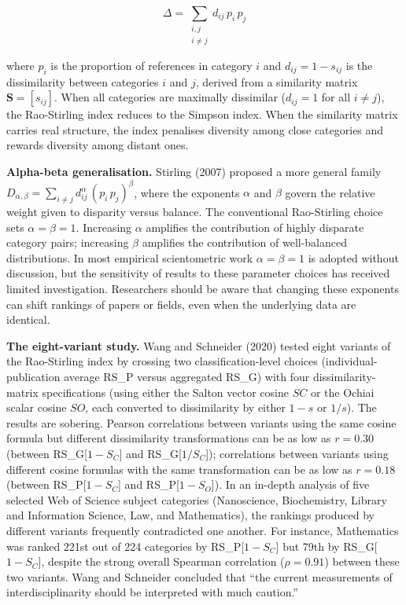 \documentclass[
]{article}
\begin{document}
\[\Delta = \sum_{\substack{i,j \\ i \neq j}} d_{ij}\, p_i\, p_j\]

where \(p_i\) is the proportion of references in category \(i\) and
\(d_{ij} = 1 - s_{ij}\) is the dissimilarity between categories \(i\)
and \(j\), derived from a similarity matrix \(\mathbf{S} = [s_{ij}]\).
When all categories are maximally dissimilar (\(d_{ij} = 1\) for all
\(i \neq j\)), the Rao-Stirling index reduces to the Simpson index. When
the similarity matrix carries real structure, the index penalises
diversity among close categories and rewards diversity among distant
ones.

\textbf{Alpha-beta generalisation.} Stirling (2007) proposed a more
general family
\(D_{\alpha,\beta} = \sum_{i \neq j} d_{ij}^{\alpha}\, (p_i\, p_j)^{\beta}\),
where the exponents \(\alpha\) and \(\beta\) govern the relative weight
given to disparity versus balance. The conventional Rao-Stirling choice
sets \(\alpha = \beta = 1\). Increasing \(\alpha\) amplifies the
contribution of highly disparate category pairs; increasing \(\beta\)
amplifies the contribution of well-balanced distributions. In most
empirical scientometric work \(\alpha = \beta = 1\) is adopted without
discussion, but the sensitivity of results to these parameter choices
has received limited investigation. Researchers should be aware that
changing these exponents can shift rankings of papers or fields, even
when the underlying data are identical.

\textbf{The eight-variant study.} Wang and Schneider (2020) tested eight
variants of the Rao-Stirling index by crossing two classification-level
choices (individual-publication average RS\_P versus aggregated RS\_G)
with four dissimilarity-matrix specifications (using either the Salton
vector cosine \(SC\) or the Ochiai scalar cosine \(SO\), each converted
to dissimilarity by either \(1 - s\) or \(1/s\)). The results are
sobering. Pearson correlations between variants using the same cosine
formula but different dissimilarity transformations can be as low as
\(r = 0.30\) (between RS\_G{[}\(1 - S_C\){]} and RS\_G{[}\(1/S_C\){]});
correlations between variants using different cosine formulas with the
same transformation can be as low as \(r = 0.18\) (between
RS\_P{[}\(1 - S_C\){]} and RS\_P{[}\(1 - S_O\){]}). In an in-depth
analysis of five selected Web of Science subject categories
(Nanoscience, Biochemistry, Library and Information Science, Law, and
Mathematics), the rankings produced by different variants frequently
contradicted one another. For instance, Mathematics was ranked 221st out
of 224 categories by RS\_P{[}\(1 - S_C\){]} but 79th by
RS\_G{[}\(1 - S_C\){]}, despite the strong overall Spearman correlation
(\(\rho = 0.91\)) between these two variants. Wang and Schneider
concluded that ``the current measurements of interdisciplinarity should
be interpreted with much caution.''
\end{document}
